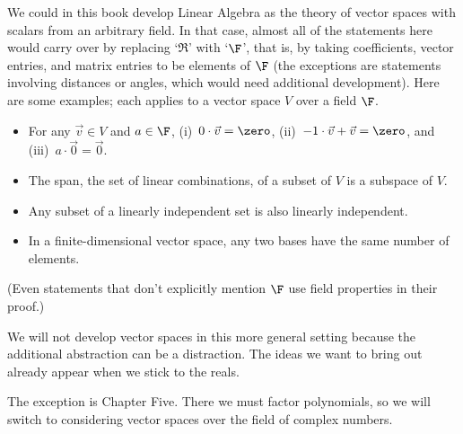 We could in this book develop Linear Algebra as the theory of
vector spaces with scalars from an arbitrary field.
In that case, 
almost all of the statements here would carry over by replacing
`\( \Re \)' with `\( \F \)', that is, by
taking coefficients, vector entries,
and matrix entries to be elements of \( \F \)
(the exceptions are statements involving distances or angles,
which would need additional development).
Here are some examples; each applies to a vector space \( V \)
over a field \( \F \).
\begin{itemize}
  \item[$*$] For any \( \vec{v}\in V \) and \( a\in\F \),
  (i)~\( 0\cdot\vec{v}=\zero \),
  (ii)~\( -1\cdot\vec{v}+\vec{v}=\zero \),
  and (iii)~\( a\cdot\vec{0}=\vec{0} \).

  \item[$*$] The span, the set of linear combinations, of a subset of \( V \)
  is a subspace of \( V \).

  \item[$*$] Any subset of a linearly independent set is also 
     linearly independent.

  \item[$*$] In a finite-dimensional vector space, 
    any two bases have the same number of elements.
\end{itemize}
(Even statements that don't explicitly mention \( \F \) use
field properties in their proof.)

We will not develop vector spaces in this more general setting because
the additional abstraction can be a distraction.
The ideas we want to bring out already appear when we stick to the reals.

The exception is Chapter Five.
There we must factor polynomials,
so we will switch to considering vector spaces over the
field of complex numbers.

